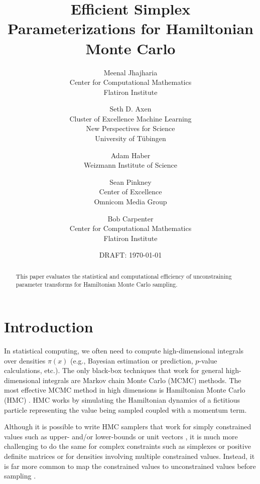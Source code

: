 \documentclass[11pt]{article}
\begin{document}
\title{Efficient Simplex Parameterizations for Hamiltonian Monte Carlo}
\author{Meenal Jhajharia
        \\ \small Center for Computational Mathematics
        \\ \small Flatiron Institute
\and \large Seth D. Axen
     \\ \small Cluster of Excellence Machine Learning
     \\ \small New Perspectives for Science
     \\ \small University of T\"ubingen
\and Adam Haber
     \\ \small Weizmann Institute of Science
\and Sean Pinkney
     \\ \small Center of Excellence
     \\ \small Omnicom Media Group
\and Bob Carpenter
     \\ \small Center for Computational Mathematics
     \\ \small Flatiron Institute
}
\date{DRAFT: \today}
\maketitle

\begin{abstract}
  \noindent
  This paper evaluates the statistical and computational
  efficiency of unconstraining parameter transforms for Hamiltonian
  Monte Carlo sampling.
\end{abstract}

\section{Introduction}

In statistical computing, we often need to compute high-dimensional
integrals over densities $\pi(x)$ (e.g., Bayesian estimation or
prediction, $p$-value calculations, etc.).  The only black-box
techniques that work for general high-dimensional integrals are
Markov chain Monte Carlo (MCMC) methods.  The most effective MCMC
method in high dimensions is Hamiltonian Monte Carlo (HMC) \cite{neal2011mcmc}.
HMC works by simulating the Hamiltonian dynamics of a fictitious particle
representing the value being sampled coupled with a momentum term.

Although it is possible to write HMC samplers that work for simply
constrained values such as upper- and/or lower-bounds
\cite{neal2011mcmc} or unit vectors \cite{byrne2013geodesic}, it is
much more challenging to do the same for complex constraints such as
simplexes or positive definite matrices or for densities involving
multiple constrained values.  Instead, it is far more common to map
the constrained values to unconstrained values before sampling
\cite{JSSv076i01, radul2021base, fjelde2020bijectors}.  
\end{document}
